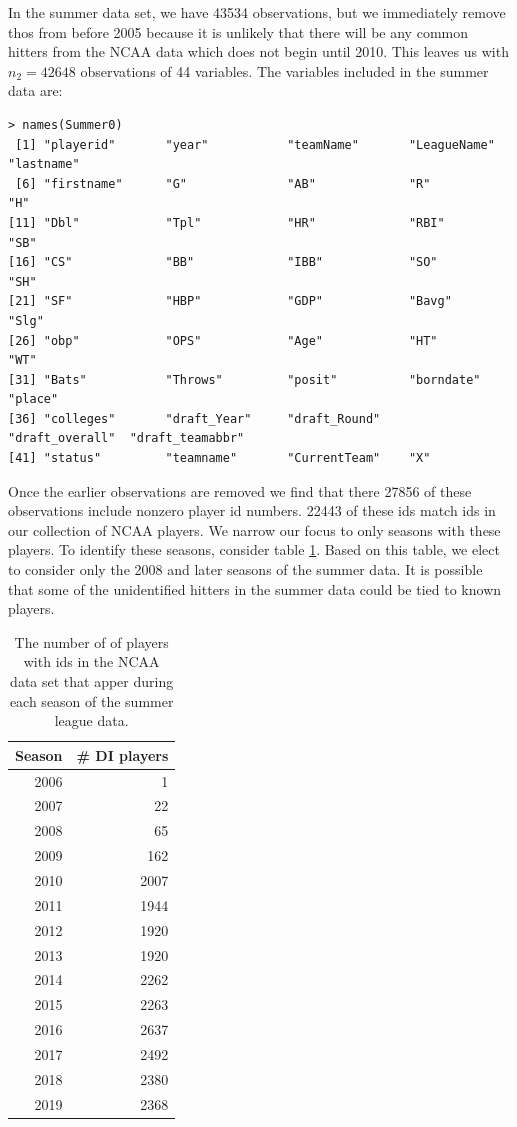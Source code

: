\documentclass [52pt] {article}
\begin{document}
In the summer data set, we have 43534 observations, but we immediately remove thos from before 2005 because it is unlikely that there will be any common hitters from the NCAA data which does not begin until 2010.  This leaves us with $n_2 = 42648$ observations of 44 variables.  The variables included in the summer data are:
\begin{verbatim}
> names(Summer0)
 [1] "playerid"       "year"           "teamName"       "LeagueName"     "lastname"      
 [6] "firstname"      "G"              "AB"             "R"              "H"             
[11] "Dbl"            "Tpl"            "HR"             "RBI"            "SB"            
[16] "CS"             "BB"             "IBB"            "SO"             "SH"            
[21] "SF"             "HBP"            "GDP"            "Bavg"           "Slg"           
[26] "obp"            "OPS"            "Age"            "HT"             "WT"            
[31] "Bats"           "Throws"         "posit"          "borndate"       "place"         
[36] "colleges"       "draft_Year"     "draft_Round"    "draft_overall"  "draft_teamabbr"
[41] "status"         "teamname"       "CurrentTeam"    "X"  
\end{verbatim}
Once the earlier observations are removed we find that there 27856 of these observations include nonzero player id numbers.  22443 of these ids match ids in our collection of NCAA players.  We narrow our focus to only seasons with these players.  To identify these seasons, consider table \ref{tab : ncaa_to_summer}.  Based on this table, we elect to consider only the 2008 and later seasons of the summer data.  It is possible that some of the unidentified hitters in the summer data could be tied to known players.
\begin{table}[ht]
\centering
\begin{tabular}{rr}
  \hline
Season & \# DI players \\ 
  \hline
2006 &   1 \\ 
  2007 &  22 \\ 
  2008 &  65 \\ 
  2009 & 162 \\ 
  2010 & 2007 \\ 
  2011 & 1944 \\ 
  2012 & 1920 \\ 
  2013 & 1920 \\ 
  2014 & 2262 \\ 
  2015 & 2263 \\ 
  2016 & 2637 \\ 
  2017 & 2492 \\ 
  2018 & 2380 \\ 
  2019 & 2368 \\ 
   \hline
\end{tabular}
\caption{\label{tab : ncaa_to_summer} The number of of players with ids in the NCAA data set that apper during each season of the summer league data.}
\end{table}
\end{document}
